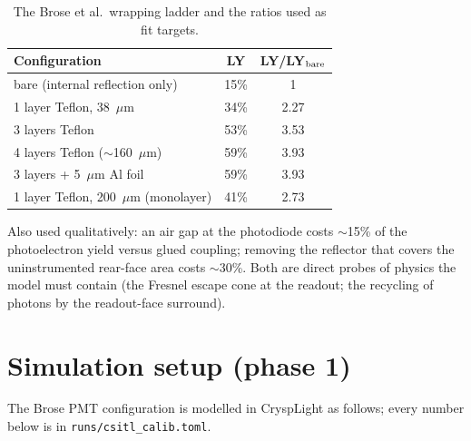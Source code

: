 \documentclass[11pt,a4paper]{article}
\begin{document}
\begin{table}[htb]
  \centering
  \caption{The Brose et al.\ wrapping ladder and the ratios used as fit targets.}
  \label{tab:ladder}
  \begin{tabular}{lcc}
    \toprule
    Configuration & LY & LY/LY$_{\rm bare}$ \\
    \midrule
    bare (internal reflection only)        & 15\% & 1    \\
    1 layer Teflon, 38~$\mu$m              & 34\% & 2.27 \\
    3 layers Teflon                        & 53\% & 3.53 \\
    4 layers Teflon ($\sim$160~$\mu$m)     & 59\% & 3.93 \\
    3 layers + 5~$\mu$m Al foil            & 59\% & 3.93 \\
    1 layer Teflon, 200~$\mu$m (monolayer) & 41\% & 2.73 \\
    \bottomrule
  \end{tabular}
\end{table}

Also used qualitatively: an air gap at the photodiode costs $\sim$15\% of the
photoelectron yield versus glued coupling; removing the reflector that covers the
uninstrumented rear-face area costs $\sim$30\%. Both are direct probes of physics the
model must contain (the Fresnel escape cone at the readout; the recycling of photons by
the readout-face surround).

\section{Simulation setup (phase 1)}
\label{sec:setup}

The Brose PMT configuration is modelled in CryspLight as follows; every number below is
in \texttt{runs/csitl\_calib.toml}.
\end{document}
